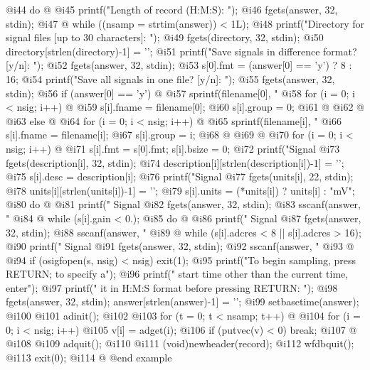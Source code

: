 {{{{{{{{{{{ @i{44}      do @{
 @i{45}          printf("Length of record (H:M:S): ");
 @i{46}          fgets(answer, 32, stdin);
 @i{47}      @} while ((nsamp = strtim(answer)) < 1L);
 @i{48}      printf("Directory for signal files [up to 30 characters]: ");
 @i{49}      fgets(directory, 32, stdin);
 @i{50}      directory[strlen(directory)-1] = '\0';
 @i{51}      printf("Save signals in difference format? [y/n]: ");
 @i{52}      fgets(answer, 32, stdin);
 @i{53}      s[0].fmt = (answer[0] == 'y') ? 8 : 16;
 @i{54}      printf("Save all signals in one file? [y/n]: ");
 @i{55}      fgets(answer, 32, stdin);
 @i{56}      if (answer[0] == 'y') @{
 @i{57}          sprintf(filename[0], "%
 @i{58}          for (i = 0; i < nsig; i++) @{
 @i{59}               s[i].fname = filename[0];
 @i{60}               s[i].group = 0;
 @i{61}          @}
 @i{62}      @}
 @i{63}      else @{
 @i{64}          for (i = 0; i < nsig; i++) @{
 @i{65}               sprintf(filename[i], "%
 @i{66}               s[i].fname = filename[i];
 @i{67}               s[i].group = i;
 @i{68}          @}
 @i{69}      @}
 @i{70}      for (i = 0; i < nsig; i++) @{
 @i{71}          s[i].fmt = s[0].fmt; s[i].bsize = 0;
 @i{72}          printf("Signal %
 @i{73}          fgets(description[i], 32, stdin);
 @i{74}          description[i][strlen(description[i])-1] = '\0';
 @i{75}          s[i].desc = description[i];
 @i{76}          printf("Signal %
 @i{77}          fgets(units[i], 22, stdin);
 @i{78}          units[i][strlen(units[i])-1] = '\0';
 @i{79}          s[i].units = (*units[i]) ? units[i] : "mV";
 @i{80}          do @{
 @i{81}              printf(" Signal %
 @i{82}              fgets(answer, 32, stdin);
 @i{83}              sscanf(answer, "%
 @i{84}          @} while (s[i].gain < 0.);
 @i{85}          do @{
 @i{86}              printf(" Signal %
 @i{87}              fgets(answer, 32, stdin);
 @i{88}              sscanf(answer, "%
 @i{89}          @} while (s[i].adcres < 8 || s[i].adcres > 16);
 @i{90}          printf(" Signal %
 @i{91}          fgets(answer, 32, stdin);
 @i{92}          sscanf(answer, "%
 @i{93}      @}
 @i{94}      if (osigfopen(s, nsig) < nsig) exit(1);
 @i{95}      printf("To begin sampling, press RETURN;  to specify a\n");
 @i{96}      printf(" start time other than the current time, enter\n");
 @i{97}      printf(" it in H:M:S format before pressing RETURN: ");
 @i{98}      fgets(answer, 32, stdin); answer[strlen(answer)-1] = '\0';
 @i{99}      setbasetime(answer);
@i{100}  
@i{101}      adinit();
@i{102}  
@i{103}      for (t = 0; t < nsamp; t++) @{
@i{104}          for (i = 0; i < nsig; i++)
@i{105}              v[i] = adget(i);
@i{106}          if (putvec(v) < 0) break;
@i{107}      @}
@i{108}  
@i{109}      adquit();
@i{110}  
@i{111}      (void)newheader(record);
@i{112}      wfdbquit();
@i{113}      exit(0);
@i{114}  @}
@end example

}}}}}}}}}}
